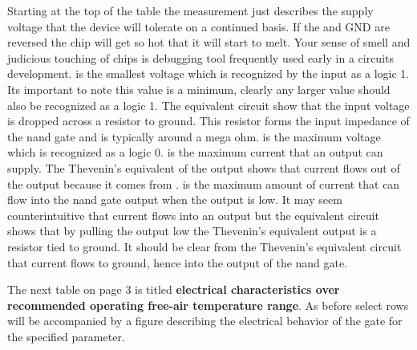Starting at the top of the table
the \VCC measurement just describes the supply voltage that the device will
tolerate on a continued basis.  If the \VCC and GND are reversed the
chip will get so hot that it will start to melt.  Your sense of smell and 
judicious touching of chips is debugging tool frequently used early in a 
circuits development.  \VIH is the smallest voltage which is recognized by 
the input as a logic 1.  Its important to note this value is a minimum, 
clearly any larger value should also be recognized as a logic 1.  The 
equivalent circuit show that the input voltage is dropped across a resistor
to ground.  This resistor forms the input impedance of the nand gate and
is typically around a mega ohm.  \VIL is the maximum voltage which is 
recognized as a logic 0.  \IOH is the maximum current that an output can 
supply.  The Thevenin's equivalent of the output shows that current flows 
out of the output because it comes from \VCC.
\IOL is the maximum amount of current that can flow into the nand gate
output when the output is low.  It may seem counterintuitive that current flows
into an output but the equivalent circuit shows that by pulling the output
low the Thevenin's equivalent output is a resistor tied to ground.  It
should be clear from the Thevenin's equivalent circuit that current flows
to ground, hence into the output of the nand gate.

The next table on page 3 is titled 
{\bf electrical characteristics over recommended operating free-air
temperature range}.  As before select rows will be accompanied by
a figure describing the electrical behavior of the gate for the 
specified parameter.

